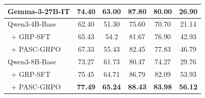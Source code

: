 \begin{table}[htbp]
\begin{tabular}{lccccc}
        Gemma-3-27B-IT         & 74.40 & 63.00 & 87.80 & 80.00 & 26.90  \\
        \midrule
        Qwen3-4B-Base               & 62.40 & 51.30 & 75.60 & 70.70 & 21.14  \\
        \rowcolor{cyan!5} %
        ~+ GRP-SFT             & 65.43 & 54.2 & 81.67 & 76.90 & 42.93  \\
        \rowcolor{cyan!5} %
        ~+ PASC-GRPO           & 67.33 & 55.43 & 82.45 & 77.83 & 46.79  \\
        \midrule
        Qwen3-8B-Base               & 73.27 & 61.73 & 80.47 & 74.27 & 29.76  \\
        \rowcolor{cyan!5} %
        ~+ GRP-SFT             & 75.45 & 64.71 & 86.79 & 82.09 & 53.93  \\
        \rowcolor{cyan!5} %
        ~+ PASC-GRPO           & \textbf{77.49} & \textbf{65.24} & \textbf{88.43} & \textbf{83.98} & \textbf{56.12}  \\
        \bottomrule
    \end{tabular}
\end{table}
